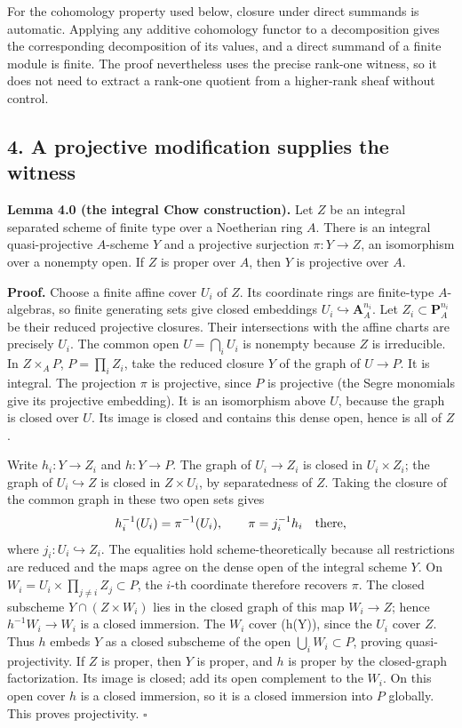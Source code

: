\documentclass[11pt]{article}
\begin{document}
For the cohomology property used below, closure under direct summands is
automatic. Applying any additive cohomology functor to a decomposition
gives the corresponding decomposition of its values, and a direct
summand of a finite module is finite. The proof nevertheless uses the
precise rank-one witness, so it does not need to extract a rank-one
quotient from a higher-rank sheaf without control.

\subsection{4. A projective modification supplies the
witness}\label{a-projective-modification-supplies-the-witness}

\textbf{Lemma 4.0 (the integral Chow construction).} Let \(Z\) be an
integral separated scheme of finite type over a Noetherian ring \(A\).
There is an integral quasi-projective \(A\)-scheme \(Y\) and a
projective surjection \(\pi:Y\to Z\), an isomorphism over a nonempty
open. If \(Z\) is proper over \(A\), then \(Y\) is projective over
\(A\).

\textbf{Proof.} Choose a finite affine cover \(U_i\) of \(Z\). Its
coordinate rings are finite-type \(A\)-algebras, so finite generating
sets give closed embeddings \(U_i\hookrightarrow\mathbf A_A^{n_i}\). Let
\(Z_i\subset\mathbf P_A^{n_i}\) be their reduced projective closures.
Their intersections with the affine charts are precisely \(U_i\). The
common open \(U=\bigcap_iU_i\) is nonempty because \(Z\) is irreducible.
In \(Z\times_A P\), \(P=\prod_iZ_i\), take the reduced closure \(Y\) of
the graph of \(U\to P\). It is integral. The projection \(\pi\) is
projective, since \(P\) is projective (the Segre monomials give its
projective embedding). It is an isomorphism above \(U\), because the
graph is closed over \(U\). Its image is closed and contains this dense
open, hence is all of \(Z\).

Write \(h_i:Y\to Z_i\) and \(h:Y\to P\). The graph of \(U_i\to Z_i\) is
closed in \(U_i\times Z_i\); the graph of \(U_i\hookrightarrow Z\) is
closed in \(Z\times U_i\), by separatedness of \(Z\). Taking the closure
of the common graph in these two open sets gives \[
h_i^{-1}(U_i)=\pi^{-1}(U_i),\qquad
\pi=j_i^{-1}h_i\quad\hbox{there},
\] where \(j_i:U_i\hookrightarrow Z_i\). The equalities hold
scheme-theoretically because all restrictions are reduced and the maps
agree on the dense open of the integral scheme \(Y\). On
\(W_i=U_i\times\prod_{j\ne i}Z_j\subset P\), the \(i\)-th coordinate
therefore recovers \(\pi\). The closed subscheme \(Y\cap(Z\times W_i)\)
lies in the closed graph of this map \(W_i\to Z\); hence
\(h^{-1}W_i\to W_i\) is a closed immersion. The \(W_i\) cover (h(Y)),
since the \(U_i\) cover \(Z\). Thus \(h\) embeds \(Y\) as a closed
subscheme of the open \(\bigcup_iW_i\subset P\), proving
quasi-projectivity. If \(Z\) is proper, then \(Y\) is proper, and \(h\)
is proper by the closed-graph factorization. Its image is closed; add
its open complement to the \(W_i\). On this open cover \(h\) is a closed
immersion, so it is a closed immersion into \(P\) globally. This proves
projectivity. \(\square\)
\end{document}
